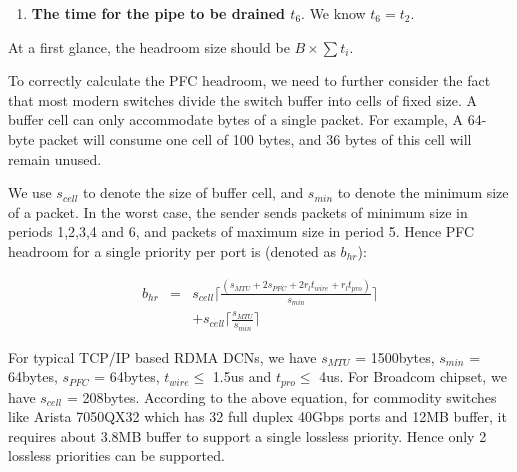 \begin{appendices}
\begin{enumerate}
\item\textbf{The time for the pipe to be drained $t_6$}. We know $t_6 = t_2$. 

\end{enumerate}

At a first glance, the headroom size should be $B\times\sum t_i$. 

 To correctly calculate the PFC headroom, we need to further consider the fact that most modern switches divide the switch buffer into cells of fixed size. A buffer cell can only accommodate bytes of a single packet. For example, A 64-byte packet will consume one cell of 100 bytes, and 36 bytes of this cell will remain unused.

 We use $s_{cell}$ to denote the size of buffer cell, and $s_{min}$ to denote the minimum size of a packet. In the worst case, the sender sends packets of minimum size in periods 1,2,3,4 and 6, and packets of maximum size in period 5. Hence
 PFC headroom for a single priority per port is (denoted as $b_{hr}$):


 \begin{eqnarray} \label{eqn:pfcheadroom}
 b_{hr}  & = &  s_{cell}\lceil\frac{(s_{MTU}+2s_{PFC}+2r_{l}t_{wire}+r_{l}t_{pro})}{s_{min}}\rceil \nonumber   \\
 & & +  s_{cell}\lceil\frac{s_{MTU}}{s_{min}}\rceil
 \end{eqnarray}

For typical TCP/IP based RDMA DCNs, we have $s_{MTU}$ = 1500bytes, $s_{min}$ = 64bytes, $s_{PFC}$ = 64bytes, $t_{wire} \leq$ 1.5us and $t_{pro}\le $ 4us. For Broadcom chipset, we have $s_{cell}$ = 208bytes. According to the above equation, for commodity switches like Arista 7050QX32 which has 32 full duplex 40Gbps ports and 12MB buffer, it requires about 3.8MB buffer to support a single lossless priority. Hence only 2 lossless priorities can be supported.
\end{appendices}